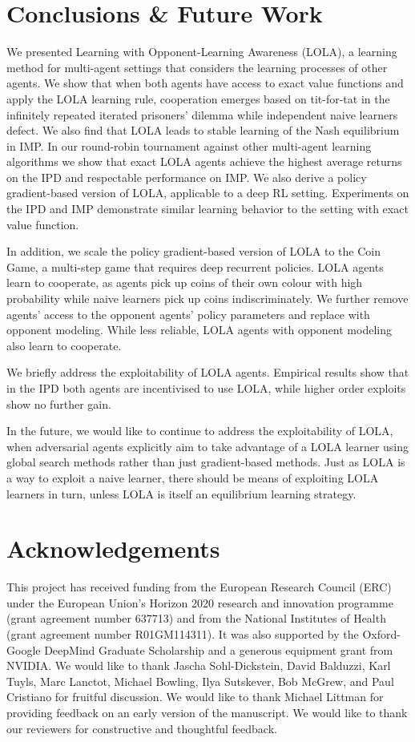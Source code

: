 \section{Conclusions \& Future Work}
\label{sec:conclusion}
We  presented Learning with Opponent-Learning Awareness (LOLA), a learning method for multi-agent settings that considers the learning processes of other agents. We show that when both agents have access to exact value functions and apply the LOLA learning rule, cooperation emerges based on tit-for-tat in the infinitely repeated iterated prisoners' dilemma while independent naive learners defect. We also find that LOLA leads to stable learning of the Nash equilibrium in IMP. In our round-robin tournament against other multi-agent learning algorithms we show that exact LOLA agents achieve the highest average returns on the IPD and respectable performance on IMP. We also derive a policy gradient-based version of LOLA, applicable to a deep RL setting. Experiments on the IPD and IMP demonstrate similar learning behavior to the setting with exact value function. 

In addition, we scale the policy gradient-based version of LOLA to the Coin Game, a multi-step game that requires deep recurrent policies. LOLA agents learn to cooperate, as agents pick up coins of their own colour with high probability while naive learners pick up coins indiscriminately. We further remove agents' access to the opponent agents' policy parameters and replace with opponent modeling. While less reliable, LOLA agents with opponent modeling also learn to cooperate. 

We briefly address the exploitability of LOLA agents. Empirical results show that in the IPD both agents are incentivised to use LOLA, while higher order exploits show no further gain. 

In the future, we would like to continue to address the exploitability of LOLA, when adversarial agents explicitly aim to take advantage of a LOLA learner using global search methods rather than just gradient-based methods. Just as LOLA is a way to exploit a naive learner, there should be means of exploiting LOLA learners in turn, unless LOLA is itself an equilibrium learning strategy. 

\section*{Acknowledgements} 
This project has received funding from the European Research Council (ERC) under the European Union's Horizon 2020 research and innovation programme (grant agreement number 637713) and from the National Institutes of Health (grant agreement number R01GM114311).
It was also supported by the Oxford-Google DeepMind Graduate Scholarship and a generous equipment grant from NVIDIA.
We would like to thank Jascha Sohl-Dickstein, David Balduzzi, Karl Tuyls, Marc Lanctot, Michael Bowling, Ilya Sutskever, Bob McGrew, and Paul Cristiano for fruitful discussion. We would like to thank Michael Littman for providing feedback on an early version of the manuscript. We would like to thank our reviewers for constructive and thoughtful feedback.
